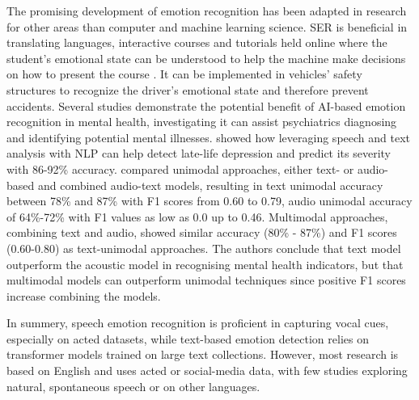 The promising development of emotion recognition has been adapted in research for other areas than computer and machine learning science. SER is beneficial in translating languages, interactive courses and tutorials held online where the student’s emotional state can be understood to help the machine make decisions on how to present the course \autocite{Abbaschian2021}. It can be implemented in vehicles’ safety structures to recognize the driver’s emotional state and therefore prevent accidents. 
Several studies \autocite{DeSouza2021, Drougkas2024, Simcock2020,Singh2023} demonstrate the potential benefit of AI-based emotion recognition in mental health, investigating it can assist psychiatrics diagnosing and identifying potential mental illnesses. \textcite{DeSouza2021} showed how leveraging speech and text analysis with NLP can help detect late-life depression and predict its severity with 86-92\% accuracy.
\textcite{Drougkas2024} compared unimodal approaches, either text- or audio-based and combined audio-text models, resulting in text unimodal accuracy between 78\% and 87\% with F1 scores from 0.60 to 0.79, audio unimodal accuracy of 64\%-72\% with F1 values as low as 0.0 up to 0.46. Multimodal approaches, combining text and audio, showed similar accuracy (80\% - 87\%) and F1 scores (0.60-0.80) as text-unimodal approaches. The authors conclude that text model outperform the acoustic model in recognising mental health indicators, but that multimodal models can outperform unimodal techniques since positive F1 scores increase combining the models. 

\medskip
In summery, speech emotion recognition is proficient in capturing vocal cues, especially on acted datasets, while text-based emotion detection relies on transformer models trained on large text collections. However, most research is based on English and uses acted or social-media data, with few studies exploring natural, spontaneous speech or on other languages.  


